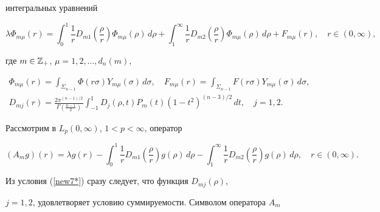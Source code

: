 интегральных уравнений


\begin{equation}


\lambda\Phi_{m\mu}(r)= \int_0^1


\frac1r D_{m1}\left(


\frac{\rho}{r}\right)\Phi_{m\mu}(\rho)\,d\rho+


\int_1^\infty \frac1r D_{m2}\left( \frac{\rho}{r}\right)


\Phi_{m\mu}(\rho)\,d\rho+F_{m\mu}(r),\quad r\in (0,\infty),\label{new6}


\end{equation}


где $m\in{\Bbb Z_+}$, $\mu=1,2,\dotsc,d_n(m)$,


\begin{gather*}


\Phi_{m\mu}(r)=\int_{\Sigma_{n-1}}\Phi(r\sigma)


Y_{m\mu}(\sigma)\,d\sigma,\quad


F_{m\mu}(r)=\int_{\Sigma_{n-1}} F(r\sigma)


Y_{m\mu}(\sigma)\,d\sigma, \\


%


D_{mj}(r)=\frac{2\pi^{(n-1)/2}}{\Gamma\left(\frac{n-1}{2}\right)}


\int_{-1}^1 D_{j}(\rho,t)


P_m(t)(1-t^2)^{(n-3)/2}\,dt, \quad j=1,2.


\end{gather*}





Рассмотрим в $L_p(0,\infty)$, $1<p<\infty$, оператор


$$




(A_m g)(r)=\lambda g(r)- \int_0^1 \frac1r D_{m1}


\left(\frac{\rho}{r}\right) g(\rho)\,d\rho-


\int_1^\infty \frac1r D_{m2} \left(\frac{\rho}{r}\right)


g(\rho)\,d\rho, \quad r\in(0,\infty).  \label{new7}




$$


Из условия (\ref{new7*}) сразу следует, что функция $D_{mj}(\rho)$,


$j=1,2$, удовлетворяет условию суммируемости. Символом оператора $A_m$


